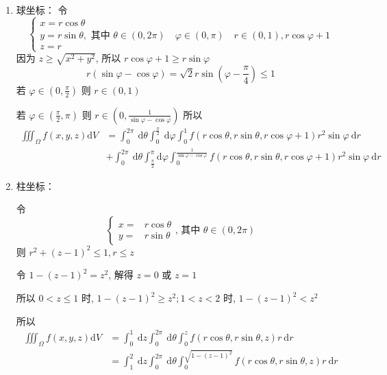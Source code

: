 \begin{solution}
\begin{enumerate}
    \item 球坐标：
    令 
    \[
    \left\{\begin{array}{l}x=r \cos \theta \\ y=r \sin \theta, \text { 其中 } \theta \in(0,2 \pi) \quad \varphi \in(0, \pi) \quad r \in(0,1), r \cos \varphi+1 \\ z=r\end{array}\right.
    \]
    因为 $z \geq \sqrt{x^2+y^2}$, 所以 $r \cos \varphi+1 \geq r \sin \varphi$
    $$
    r(\sin \varphi-\cos \varphi)=\sqrt{2} r \sin \left(\varphi-\frac{\pi}{4}\right) \leq 1
    $$
    若 $\varphi \in\left(0, \frac{\pi}{2}\right)$ 则 $r \in(0,1)$

    若 $\varphi \in\left(\frac{\pi}{2}, \pi\right)$ 则 $r \in\left(0, \frac{1}{\sin \varphi-\cos \varphi}\right)$
    所以
    $$
    \begin{aligned}
    \iiint_{\Omega} f(x, y, z) \mathrm{d} V& =\int_0^{2 \pi} \mathrm{~d} \theta \int_0^{\frac{\pi}{2}} \mathrm{~d} \varphi \int_0^1 f(r \cos \theta, r \sin \theta, r \cos \varphi+1) r^2 \sin \varphi \mathrm{~d} r \\
& +\int_0^{2 \pi} \mathrm{~d} \theta \int_{\frac{\pi}{2}}^\pi \mathrm{d} \varphi \int_0^{\frac{1}{\sin \varphi-\cos \varphi}} f(r \cos \theta, r \sin \theta, r \cos \varphi+1) r^2 \sin \varphi \mathrm{~d} r
\end{aligned}
$$
\item 柱坐标：

令 
\[\left\{\begin{array}{ll}
    x= & r \cos \theta \\
    y= & r \sin \theta
    \end{array} \text {, 其中 } \theta \in(0,2 \pi)\right.\]
则  $r^2+(z-1)^2  \leq 1   ,r   \leq z $

令 $1-(z-1)^2=z^2$, 解得 $z=0$ 或 $z=1$

所以 $0<z \leq 1$ 时, $1-(z-1)^2 \geq z^2 ; 1<z<2$ 时, $1-(z-1)^2<z^2$

所以
\begin{align*}
    \iiint_{\Omega} f(x, y, z) \mathrm{d} V&=\int_0^1 \mathrm{~d} z \int_0^{2 \pi} \mathrm{~d} \theta \int_0^z f(r \cos \theta, r \sin \theta, z) r \mathrm{~d} r\\
    &=\int_1^2 \mathrm{~d} z \int_0^{2 \pi} \mathrm{~d} \theta \int_0^{\sqrt{1-(z-1)^2}} f(r \cos \theta, r \sin \theta, z) r \mathrm{~d} r
\end{align*}    
\end{enumerate}
\end{solution}

